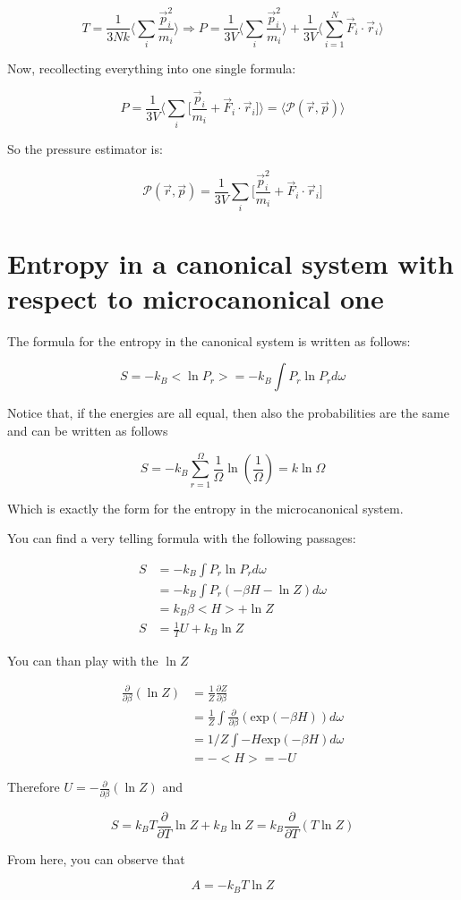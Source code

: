 	$$T = \frac{1}{3Nk}\biggl\langle\sum\limits_i\frac{\vec{p}_i^2}{m_i}\biggr\rangle\Rightarrow P = \frac{1}{3V}\biggl\langle\sum\limits_i\frac{\vec{p}^2_i}{m_i}\biggr\rangle + \frac{1}{3V}\biggl\langle\sum\limits_{i=1}^N\vec{F}_i\cdot\vec{r}_i\biggr\rangle$$

	Now, recollecting everything into one single formula:

	$$P = \frac{1}{3V}\biggl\langle\sum\limits_i\biggl[\frac{\vec{p}_i}{m_i}+ \vec{F}_i\cdot\vec{r}_i\biggr]\biggr\rangle = \langle\mathcal{P}(\vec{r}, \vec{p})\rangle$$

	So the pressure estimator is:

	$$\mathcal{P}(\vec{r}, \vec{p}) = \frac{1}{3V}\sum\limits_i\biggl[\frac{\vec{p}_i^2}{m_i}+ \vec{F}_i\cdot\vec{r}_i\biggr]$$

	\section{Entropy in a canonical system with respect to microcanonical one}

	The formula for the entropy in the canonical system is written as follows:

	$$
	S = - k_B <\ln P_r> = - k_B \int{P_r \ln{P_r} d\omega}
	$$

	Notice that, if the energies are all equal, then also the probabilities are the same and can be written as follows

	$$
	S = - k_B \sum_{r = 1}^\Omega{\frac{1}{\Omega} \ln{\left(\frac{1}{\Omega}\right)}} = k \ln \Omega
	$$

	Which is exactly the form for the entropy in the microcanonical system.


	You can find a very telling formula with the following passages:

	\begin{align*}
		S &= - k_B \int{P_r \ln{P_r} d\omega} \\
		&= - k_B \int{P_r (-\beta H - \ln{Z}) d\omega} \\
		&= k_B \beta <H> + \ln{Z} \\
		S &= \frac{1}{T} U + k_B \ln{Z}
	\end{align*}

	You can than play with the $\ln Z$ 

	\begin{align*}
		\frac{\partial}{\partial \beta} (\ln Z) &= \frac{1}{Z} 
		\frac{\partial Z}{\partial \beta} \\ 
		&= \frac{1}{Z} 
		\int{\frac{\partial}{\partial \beta} (\text{exp}(-\beta H)) d\omega} \\
		&= 1/Z \int{-H \text{exp}(-\beta H) d\omega} \\
		&= - <H> = -U
	\end{align*}

	Therefore $U = - \frac{\partial}{\partial \beta}(\ln{Z})$ and 

	$$
	S = k_B T \frac{\partial}{\partial T}\ln{Z} + k_B \ln{Z} = k_B \frac{\partial}{\partial T}(T \ln{Z})
	$$

	From here, you can observe that

	$$
	A =  - k_B T \ln{Z}
	$$


